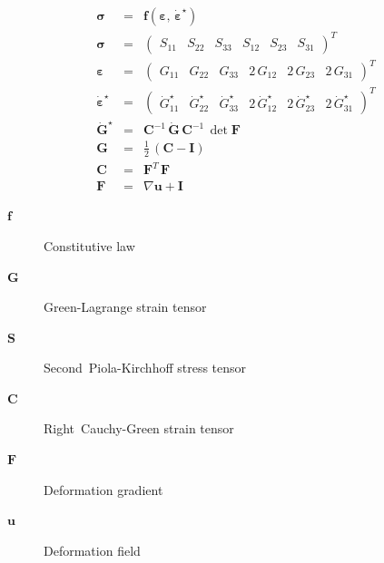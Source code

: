 \begin{eqnarray}
  \label{sec:EL:SOLID:constlaw}
  \boldsymbol{\sigma} & = & \boldsymbol{f}\left(\boldsymbol{\varepsilon},\, \dot{\boldsymbol{\varepsilon}}^{\star}\right) \\
  \boldsymbol{\sigma} & = & \begin{pmatrix} S_{11} & S_{22} & S_{33} & S_{12} & S_{23} & S_{31} \end{pmatrix}^T \\
  \boldsymbol{\varepsilon} & = & \begin{pmatrix} G_{11} & G_{22} & G_{33} & 2\,G_{12} & 2\,G_{23} & 2\,G_{31} \end{pmatrix}^T \\
  \dot{\boldsymbol{\varepsilon}}^{\star} & = & \begin{pmatrix} \dot{G}_{11}^{\star} & \dot{G}_{22}^{\star} & \dot{G}_{33}^{\star} & 2\,\dot{G}_{12}^{\star} & 2\,\dot{G}_{23}^{\star} & 2\,\dot{G}_{31}^{\star} \end{pmatrix}^T \\
  \dot{\boldsymbol{G}}^{\star} & = & \boldsymbol{C}^{-1} \, \dot{\boldsymbol{G}} \, \boldsymbol{C}^{-1} \, \det{\boldsymbol{F}} \\
  \boldsymbol{G} & = & \frac{1}{2}\,\left(\boldsymbol{C} - \boldsymbol{I}\right) \\
  \boldsymbol{C} & = & \boldsymbol{F}^T\,\boldsymbol{F} \\
  \boldsymbol{F} & = & \nabla \boldsymbol{u} + \boldsymbol{I}
\end{eqnarray}
\begin{description}
\item[$\boldsymbol{f}$] Constitutive law
\item[$\boldsymbol{G}$] Green-Lagrange strain tensor
\item[$\boldsymbol{S}$] Second~Piola-Kirchhoff stress tensor
\item[$\boldsymbol{C}$] Right~Cauchy-Green strain tensor
\item[$\boldsymbol{F}$] Deformation gradient
\item[$\boldsymbol{u}$] Deformation field
\end{description}


